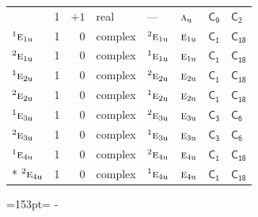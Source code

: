\documentclass[10pt,a4paper]{article}
\newcommand{\needspace}[1]{\par\penalty-100\begingroup\dimen0=#1\relax\dimen2=\pagegoal
  \advance\dimen2-\pagetotal\ifdim\dimen0>\dimen2\relax\ifdim\dimen2>0pt\vfil\break\fi\fi
  \endgroup}
\numberwithin{equation}{section}
\newcommand{\grp}[1]{\mathsf{#1}}
\newcommand{\irr}[1]{\text{\normalfont\scshape #1}}
\newcommand{\conjpair}[1]{{}^{#1}}
\newcommand{\detbox}[1]{{\setlength{\fboxsep}{1pt}\fbox{#1}}}
\newcommand{\ptag}[1]{\mathrm{#1}}
\begin{document}
{\begin{longtable}{@{}lrrlllll@{}}
\detbox{$\irr{a}_{\ptag{u}}$} & 1 & $+1$ & real & --- & $\irr{a}_{\ptag{u}}$ & \href{C9.pdf}{$\grp{C_{9}}$} & \href{../../../rotation/data/pdf/C2.pdf}{$\grp{C_{2}}$}\\
$\conjpair{1}\irr{e}_{1\ptag{u}}$ & 1 & $0$ & complex & $\conjpair{2}\irr{e}_{1\ptag{u}}$ & $\irr{e}_{1\ptag{u}}$ & \href{C1.pdf}{$\grp{C_{1}}$} & $\grp{C_{18}}$\\
$\conjpair{2}\irr{e}_{1\ptag{u}}$ & 1 & $0$ & complex & $\conjpair{1}\irr{e}_{1\ptag{u}}$ & $\irr{e}_{1\ptag{u}}$ & \href{C1.pdf}{$\grp{C_{1}}$} & $\grp{C_{18}}$\\
$\conjpair{1}\irr{e}_{2\ptag{u}}$ & 1 & $0$ & complex & $\conjpair{2}\irr{e}_{2\ptag{u}}$ & $\irr{e}_{2\ptag{u}}$ & \href{C1.pdf}{$\grp{C_{1}}$} & $\grp{C_{18}}$\\
$\conjpair{2}\irr{e}_{2\ptag{u}}$ & 1 & $0$ & complex & $\conjpair{1}\irr{e}_{2\ptag{u}}$ & $\irr{e}_{2\ptag{u}}$ & \href{C1.pdf}{$\grp{C_{1}}$} & $\grp{C_{18}}$\\
$\conjpair{1}\irr{e}_{3\ptag{u}}$ & 1 & $0$ & complex & $\conjpair{2}\irr{e}_{3\ptag{u}}$ & $\irr{e}_{3\ptag{u}}$ & \href{C3.pdf}{$\grp{C_{3}}$} & \href{../../../rotation/data/pdf/C6.pdf}{$\grp{C_{6}}$}\\
$\conjpair{2}\irr{e}_{3\ptag{u}}$ & 1 & $0$ & complex & $\conjpair{1}\irr{e}_{3\ptag{u}}$ & $\irr{e}_{3\ptag{u}}$ & \href{C3.pdf}{$\grp{C_{3}}$} & \href{../../../rotation/data/pdf/C6.pdf}{$\grp{C_{6}}$}\\
$\conjpair{1}\irr{e}_{4\ptag{u}}$ & 1 & $0$ & complex & $\conjpair{2}\irr{e}_{4\ptag{u}}$ & $\irr{e}_{4\ptag{u}}$ & \href{C1.pdf}{$\grp{C_{1}}$} & $\grp{C_{18}}$\\*
$\conjpair{2}\irr{e}_{4\ptag{u}}$ & 1 & $0$ & complex & $\conjpair{1}\irr{e}_{4\ptag{u}}$ & $\irr{e}_{4\ptag{u}}$ & \href{C1.pdf}{$\grp{C_{1}}$} & $\grp{C_{18}}$\\
\bottomrule\end{longtable}}
\needspace{153pt}
\end{document}
